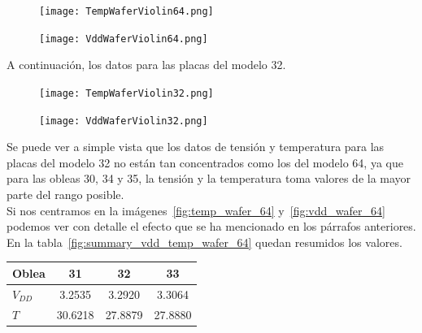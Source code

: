 \documentclass[spanish]{template/minim}
\begin{document}
\begin{figure}[H]
    \centering
    \texttt{[image: TempWaferViolin64.png]}
\end{figure}%

\begin{figure}[H]
    \centering
    \texttt{[image: VddWaferViolin64.png]}
\end{figure}%

A continuación, los datos para las placas del modelo 32.\\

\begin{figure}[H]
    \centering
    \texttt{[image: TempWaferViolin32.png]}
\end{figure}%

\begin{figure}[H]
    \centering
    \texttt{[image: VddWaferViolin32.png]}
\end{figure}%

Se puede ver a simple vista que los datos de tensión y temperatura para las placas del modelo 32 no están tan concentrados como los del modelo 64, ya que para las obleas 30, 34 y 35, la tensión y la temperatura toma valores de la mayor parte del rango posible.\\

Si nos centramos en la imágenes~\ref{fig:temp_wafer_64} y~\ref{fig:vdd_wafer_64} podemos ver con detalle el efecto que se ha mencionado en los párrafos anteriores. En la tabla~\ref{fig:summary_vdd_temp_wafer_64} quedan resumidos los valores.\\

\begin{table}[h]
    \centering
    \begin{tabularx}{\columnwidth}{XSSS}
        \toprule
        Oblea & 31 & 32 & 33 \\
        \midrule
        $V_{DD}$ &  3.2535 & 3.2920 & 3.3064 \\
        $T$ & 30.6218 & 27.8879 & 27.8880\\
        \bottomrule
    \end{tabularx}


\end{table}
\end{document}
